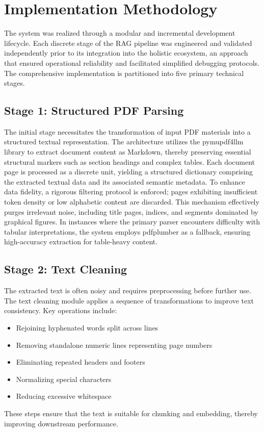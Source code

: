 \documentclass[12pt,a4paper]{report}
\begin{document}
\section{Implementation Methodology}
The system was realized through a modular and incremental development lifecycle. Each discrete stage of the RAG pipeline was engineered and validated independently prior to its integration into the holistic ecosystem, an approach that ensured operational reliability and facilitated simplified debugging protocols.
The comprehensive implementation is partitioned into five primary technical stages.


\subsection{Stage 1: Structured PDF Parsing}
The initial stage necessitates the transformation of input PDF materials into a structured textual representation. The architecture utilizes the pymupdf4llm library to extract document content as Markdown, thereby preserving essential structural markers such as section headings and complex tables.
Each document page is processed as a discrete unit, yielding a structured dictionary comprising the extracted textual data and its associated semantic metadata.
To enhance data fidelity, a rigorous filtering protocol is enforced; pages exhibiting insufficient token density or low alphabetic content are discarded. This mechanism effectively purges irrelevant noise, including title pages, indices, and segments dominated by graphical figures.
In instances where the primary parser encounters difficulty with tabular interpretations, the system employs pdfplumber as a fallback, ensuring high-accuracy extraction for table-heavy content.
\subsection{Stage 2: Text Cleaning}
The extracted text is often noisy and requires preprocessing before further use. The text cleaning module applies a sequence of transformations to improve text consistency.
Key operations include:
\begin{itemize}
\item Rejoining hyphenated words split across lines
\item Removing standalone numeric lines representing page numbers
\item Eliminating repeated headers and footers
\item Normalizing special characters
\item Reducing excessive whitespace
\end{itemize}
These steps ensure that the text is suitable for chunking and embedding, thereby improving downstream performance.
\end{document}
